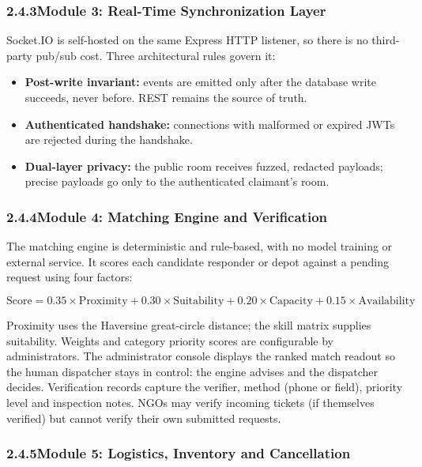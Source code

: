 \documentclass[11pt,a4paper]{article}
\begin{document}
\subsubsection{2.4.3\quad Module 3: Real-Time Synchronization Layer}\label{s243}

Socket.IO is self-hosted on the same Express HTTP listener, so there is no third-party pub/sub cost. Three architectural rules govern it:

\begin{itemize}
\item \textbf{Post-write invariant:} events are emitted only after the database write succeeds, never before. REST remains the source of truth.
\item \textbf{Authenticated handshake:} connections with malformed or expired JWTs are rejected during the handshake.
\item \textbf{Dual-layer privacy:} the public room receives fuzzed, redacted payloads; precise payloads go only to the authenticated claimant's room.
\end{itemize}

\subsubsection{2.4.4\quad Module 4: Matching Engine and Verification}\label{s244}

The matching engine is deterministic and rule-based, with no model training or external service. It scores each candidate responder or depot against a pending request using four factors:

\[
\text{Score} = 0.35\times\text{Proximity} + 0.30\times\text{Suitability} + 0.20\times\text{Capacity} + 0.15\times\text{Availability}
\]

Proximity uses the Haversine great-circle distance; the skill matrix supplies suitability. Weights and category priority scores are configurable by administrators. The administrator console displays the ranked match readout so the human dispatcher stays in control: the engine advises and the dispatcher decides. Verification records capture the verifier, method (phone or field), priority level and inspection notes. NGOs may verify incoming tickets (if themselves verified) but cannot verify their own submitted requests.

\subsubsection{2.4.5\quad Module 5: Logistics, Inventory and Cancellation}\label{s245}
\end{document}
